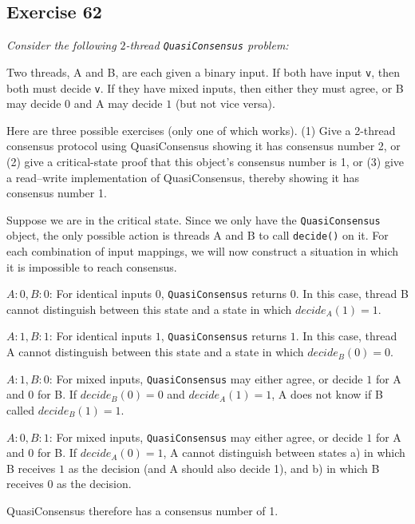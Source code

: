 \documentclass[a4paper,10pt]{article}
\begin{document}
\subsection{Exercise 62}

{\itshape Consider the following $2$-thread \lstinline|QuasiConsensus| problem:

Two threads, A and B, are each given a binary input. If both have input \lstinline|v|, then
both must decide \lstinline|v|. If they have mixed inputs, then either they must agree, or B
may decide $0$ and A may decide $1$ (but not vice versa).

Here are three possible exercises (only one of which works). (1) Give a 2-thread
consensus protocol using QuasiConsensus showing it has consensus number 2,
or (2) give a critical-state proof that this object’s consensus number is 1, or (3)
give a read–write implementation of QuasiConsensus, thereby showing it has
consensus number 1.}

\vspace{3mm}

Suppose we are in the critical state. Since we only have the \lstinline|QuasiConsensus| object,
the only possible action is threads A and B to call \lstinline|decide()| on it.
For each combination of input mappings, we will now construct a situation in which it is impossible
to reach consensus.

$A: 0, B: 0$: For identical inputs $0$, \lstinline|QuasiConsensus| returns $0$. In this case,
thread B cannot distinguish between this state and a state in which $\textit{decide}_A(1) = 1$.

$A: 1, B: 1$: For identical inputs $1$, \lstinline|QuasiConsensus| returns $1$. In this case,
thread A cannot distinguish between this state and a state in which $\textit{decide}_B(0) = 0$.

$A: 1, B: 0$: For mixed inputs, \lstinline|QuasiConsensus| may either agree, or decide $1$ for A and $0$ for B.
If $\textit{decide}_B(0) = 0$ and $\textit{decide}_A(1) = 1$, A does not know if B called $\textit{decide}_B(1) = 1$.

$A: 0, B: 1$: For mixed inputs, \lstinline|QuasiConsensus| may either agree, or decide $1$ for A and $0$ for B.
If $\textit{decide}_A(0) = 1$, A cannot distinguish between states a) in which B receives $1$ as the decision (and A should also decide 1), and b) in which B receives $0$ as the decision.

QuasiConsensus therefore has a consensus number of 1.
\end{document}
